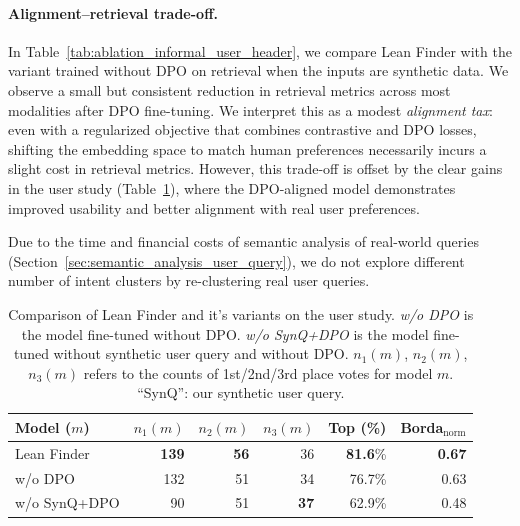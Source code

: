 \documentclass{article} %
\begin{document}
\paragraph{Alignment–retrieval trade-off.}
In Table~\ref{tab:ablation_informal_user_header}, we compare Lean Finder with the variant trained without DPO on retrieval when the inputs are synthetic data. We observe a small but consistent reduction in retrieval metrics across most modalities after DPO fine-tuning. We interpret this as a modest \emph{alignment tax}: even with a regularized objective that combines contrastive and DPO losses, shifting the embedding space to match human preferences necessarily incurs a slight cost in retrieval metrics. However, this trade-off is offset by the clear gains in the user study (Table~\ref{tab:user_study_ablation}), where the DPO-aligned model demonstrates improved usability and better alignment with real user preferences.

Due to the time and financial costs of semantic analysis of real-world queries (Section~\ref{sec:semantic_analysis_user_query}), we do not explore different number of intent clusters by re-clustering real user queries.

\begin{table}[h!]
\captionsetup{font=small}
\caption{Comparison of Lean Finder and it's variants on the user study. \textit{w/o DPO} is the model fine-tuned without DPO. \textit{w/o SynQ+DPO} is the model fine-tuned without synthetic user query and without DPO. $n_1(m)$, $n_2(m)$, $n_3(m)$ refers to the counts of 1st/2nd/3rd place votes for model \(m\). ``SynQ'': our synthetic user query.}
\centering
\begin{tabular}{lrrrrr}
\toprule
Model ($m$) & $n_1(m)$ & $n_2(m)$ & $n_3(m)$& Top\textendash3 (\%) & Borda$_\text{norm}$ \\
\midrule
Lean Finder & \textbf{139} & \textbf{56} & 36 & \textbf{81.6}\% & \textbf{0.67} \\
\quad w/o DPO & 132 & 51 & 34 & 76.7\% & 0.63 \\
\quad w/o SynQ+DPO & 90 & 51 & \textbf{37} & 62.9\%  & 0.48 \\
\bottomrule
\end{tabular}
\vspace{-1em}
\label{tab:user_study_ablation}
\end{table}
\end{document}
